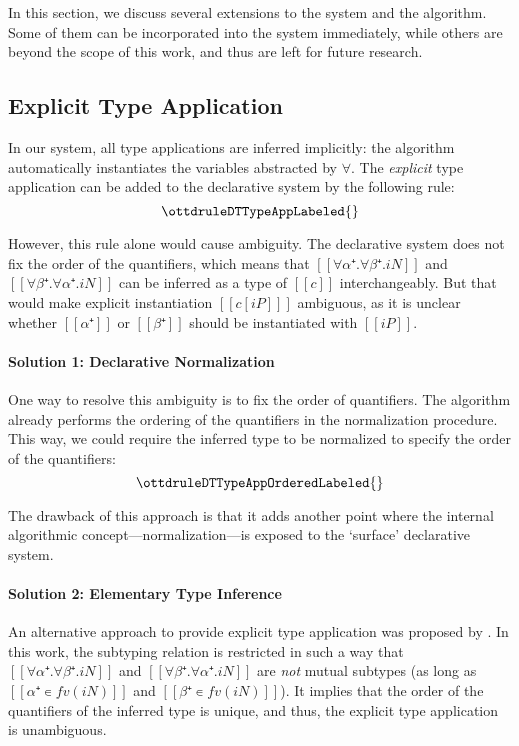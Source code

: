 \label{sec:extensions}

In this section, we discuss several extensions to the system and the algorithm.
Some of them can be incorporated into the system immediately, while others
are beyond the scope of this work, and thus are left for future research.

\subsection{Explicit Type Application}
\label{sec:explicit-type-application}

In our system, all type applications are inferred implicitly: the algorithm
automatically instantiates the variables abstracted by $\forall$. 
The \emph{explicit} type application can be added to the declarative system by the following rule:
$$\ottdruleDTTypeAppLabeled{}$$

However, this rule alone would cause ambiguity. The declarative system does not
fix the order of the quantifiers, which means that $[[∀α⁺.∀β⁺.iN]]$ and
$[[∀β⁺.∀α⁺.iN]]$ can be inferred as a type of $[[c]]$ interchangeably. But that
would make explicit instantiation $[[ c[iP] ]]$ ambiguous, as it is unclear
whether $[[α⁺]]$ or $[[β⁺]]$ should be instantiated with $[[iP]]$.

\paragraph*{Solution 1: Declarative Normalization}
One way to resolve this ambiguity is to fix the order of quantifiers.  
The algorithm already performs the ordering of the quantifiers in the normalization procedure.
This way, we could require the inferred type to be normalized
to specify the order of the quantifiers:
$$\ottdruleDTTypeAppOrderedLabeled{}$$

The drawback of this approach is that it adds another point where the internal
algorithmic concept---normalization---is exposed to the `surface' declarative
system.

\paragraph*{Solution 2: Elementary Type Inference}
An alternative approach to provide explicit type application
 was proposed by \cite{zhao22:elementary}.
In this work, the subtyping relation is restricted 
in such a way that 
$[[∀α⁺.∀β⁺.iN]]$ and $[[∀β⁺.∀α⁺.iN]]$ are \emph{not} mutual subtypes 
(as long as $[[α⁺ ∊ fv(iN)]]$ and $[[β⁺ ∊ fv(iN)]]$).
It implies that the order of the quantifiers of the inferred type is unique,
and thus, the explicit type application is unambiguous.

